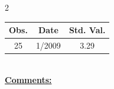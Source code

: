 
\bigskip 
\begin{multicols}{2}{ 
\begin{tabular}{ccc}
\hline  Obs.  &  Date &  Std. Val. \\ 
\hline 
                       25 &        1/2009 &          3.29 \vspace{-.12in} \\  
 \end{tabular} 
\\ 
 \columnbreak 
 \singlespacing 
 \underline{\textbf{Comments:}} \\ 
 \bigskip       

 } 
\end{multicols} 
